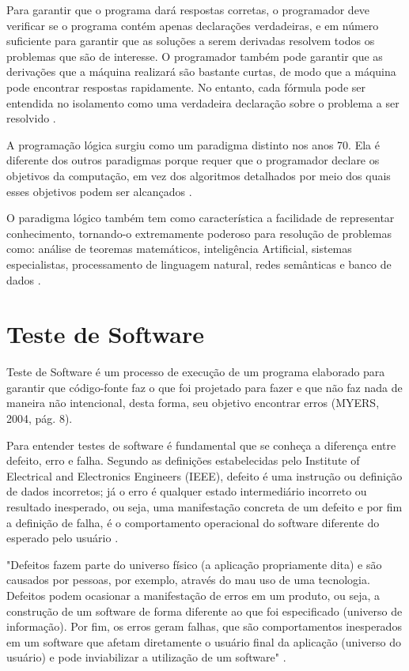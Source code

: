Para garantir que o programa dará respostas corretas, o programador deve verificar se o programa contém apenas declarações verdadeiras, e em número suficiente para garantir que as soluções a serem derivadas resolvem todos os  problemas que são de interesse. O programador também pode garantir que as derivações que a máquina realizará são bastante curtas, de modo que a máquina pode encontrar respostas rapidamente. No entanto, cada fórmula pode ser entendida no isolamento como uma verdadeira declaração sobre o problema a ser resolvido \cite[pág.~2]{spivey1996}.

A programação lógica surgiu como um paradigma distinto nos anos 70. Ela é diferente dos outros paradigmas porque requer que o programador declare os objetivos da computação, em vez dos algoritmos detalhados por meio dos quais esses objetivos podem ser alcançados \cite[pág.~412]{tucker2009}.

O paradigma lógico também tem como característica a facilidade de representar conhecimento, tornando-o extremamente poderoso para resolução de problemas como: análise de teoremas matemáticos, inteligência Artificial, sistemas especialistas, processamento de linguagem natural, redes semânticas e banco de dados \cite{almeida2010}.

\section{Teste de Software}

Teste de Software é um processo de execução de um programa elaborado para garantir que código-fonte faz o que foi projetado para fazer e que não faz nada de maneira não intencional, desta forma, seu objetivo encontrar erros \cite[pág.~8]{myers2004} (MYERS, 2004, pág. 8).

Para entender testes de software  é fundamental que se conheça a diferença entre defeito, erro e falha. Segundo as definições estabelecidas pelo Institute of Electrical and Electronics Engineers (IEEE), defeito é uma instrução ou definição de dados incorretos; já o erro é qualquer estado intermediário incorreto ou resultado inesperado, ou seja,  uma manifestação concreta de um defeito e por fim a definição de falha, é o comportamento operacional do software diferente do esperado pelo usuário \cite{ieee}.

\begin{citacao}
"Defeitos fazem parte do universo físico (a aplicação propriamente dita) e são causados por pessoas, por exemplo, através do mau uso de uma tecnologia. Defeitos podem ocasionar a manifestação de erros em um produto, ou seja, a construção de um software de forma diferente ao que foi especificado (universo de informação). Por fim, os erros geram falhas, que são comportamentos inesperados em um software que afetam diretamente o usuário final da aplicação (universo do usuário) e pode inviabilizar a utilização de um software" \cite{neto2005}.
\end{citacao}

